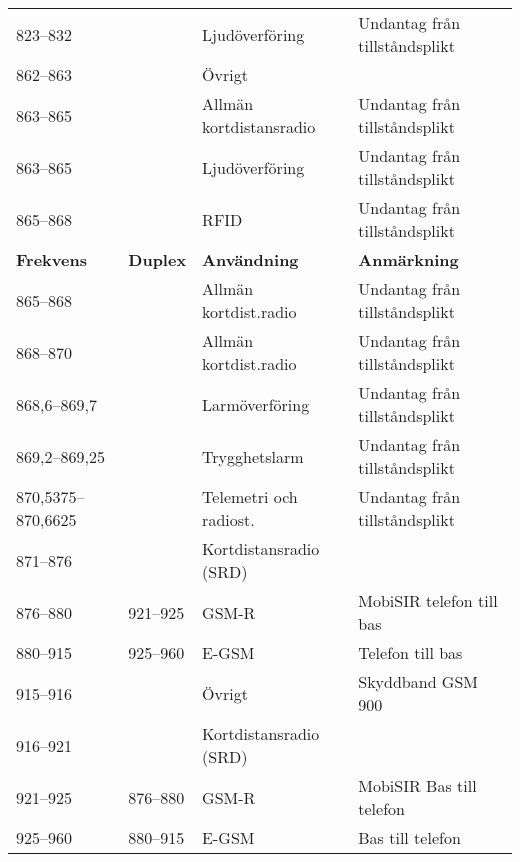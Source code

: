 \documentclass[10pt,swedish,a4paper,twoside]{article}
\begin{document}
\begin{landscape}
\begin{longtable}{llll}
	823--832           &                    & Ljudöverföring          & Undantag från tillståndsplikt            \\
	862--863           &                    & Övrigt                  &  \\
	863--865           &                    & Allmän kortdistansradio & Undantag från tillståndsplikt            \\
	863--865           &                    & Ljudöverföring          & Undantag från tillståndsplikt            \\
	865--868           &                    & RFID                    & Undantag från tillståndsplikt            \\
	\textbf{Frekvens}  & \textbf{Duplex}    & \textbf{Användning}     & \textbf{Anmärkning}                      \\ \hline
	865--868           &                    & Allmän kortdist.radio   & Undantag från tillståndsplikt            \\
	868--870           &                    & Allmän kortdist.radio   & Undantag från tillståndsplikt            \\
	868,6--869,7       &                    & Larmöverföring          & Undantag från tillståndsplikt            \\
	869,2--869,25      &                    & Trygghetslarm           & Undantag från tillståndsplikt            \\
	870,5375--870,6625 &                    & Telemetri och radiost.  & Undantag från tillståndsplikt            \\
	871--876           &                    & Kortdistansradio (SRD)  &  \\
	876--880           & 921--925           & GSM-R                   & MobiSIR telefon till bas                 \\
	880--915           & 925--960           & E-GSM                   & Telefon till bas                         \\
	915--916           &                    & Övrigt                  & Skyddband GSM 900                        \\
	916--921           &                    & Kortdistansradio (SRD)  &  \\
	921--925           & 876--880           & GSM-R                   & MobiSIR Bas till telefon                 \\
	925--960           & 880--915           & E-GSM                   & Bas till telefon                         \\

\end{longtable}
\end{landscape}
\end{document}
